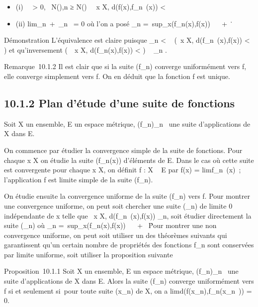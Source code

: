 \documentclass[]{article}
\begin{document}
\begin{itemize}
\itemsep1pt\parskip0pt
\item
  (i) \forall~~\epsilon > 0,
  \exists~N(\epsilon),\quad n ≥ N(\epsilon)
  \rigtharrow~\forall~x \in X, d(f(x),f_n~(x)) <
  \epsilon
\item
  (ii) lim_n\rightarrow~+\infty~\mu_n~ = 0 où
  l'on a posé \mu_n =\
  sup_x\inXd(f_n(x),f(x)) \in {}~ \cup\ +
  \infty~\.
\end{itemize}

Démonstration L'équivalence est claire puisque \mu_n <
\epsilon \rigtharrow~ (\forall~x \in X, d(f_n~(x),f(x))
< \epsilon) et qu'inversement (\forall~~x \in X,
d(f_n(x),f(x)) < \epsilon) \rigtharrow~ \mu_n \leq \epsilon.

Remarque~10.1.2 Il est clair que si la suite (f_n) converge
uniformément vers f, elle converge simplement vers f. On en déduit que
la fonction f est unique.

\subsection{10.1.2 Plan d'étude d'une suite de fonctions}

Soit X un ensemble, E un espace métrique, (f_n)_n\in{}~
une suite d'applications de X dans E.

On commence par étudier la convergence simple de la suite de fonctions.
Pour chaque x \in X on étudie la suite (f_n(x)) d'éléments de E.
Dans le cas où cette suite est convergente pour chaque x \in X, on définit
f : X \rightarrow~ E par f(x) = limf_n~(x)~;
l'application f est limite simple de la suite (f_n).

On étudie ensuite la convergence uniforme de la suite (f_n)
vers f. Pour montrer une convergence uniforme, on peut soit chercher une
suite (\alpha_n) de limite 0 indépendante de x telle que
\forall~x \in X, d(f_n~(x),f(x)) \leq
\alpha_n, soit étudier directement la suite (\mu_n) où
\mu_n =\
sup_x\inXd(f_n(x),f(x)) \in {}~ \cup\ +
\infty~\. Pour montrer une non convergence uniforme, on peut
soit utiliser un des théorèmes suivants qui garantissent qu'un certain
nombre de propriétés des fonctions f_n sont conservées par
limite uniforme, soit utiliser la proposition suivante

Proposition~10.1.1 Soit X un ensemble, E un espace métrique,
(f_n)_n\in{}~ une suite d'applications de X dans E. Alors
la suite (f_n) converge uniformément vers f si et seulement
si~pour toute suite (x_n) de X, on a
limd(f(x_n),f_n(x_n~))
= 0.
\end{document}
